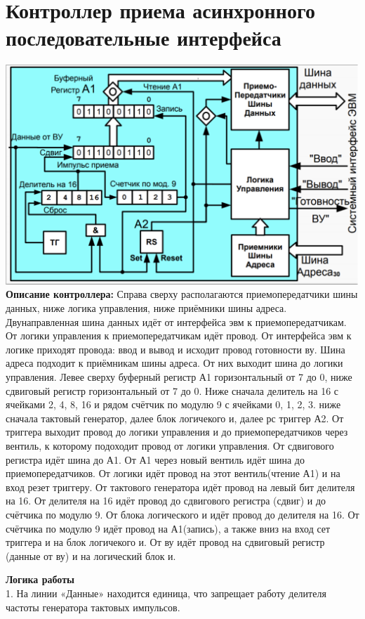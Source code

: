 \documentclass{article}
\begin{document}
\section{Контроллер приема асинхронного последовательные интерфейса}
\includegraphics[width=.8\textwidth]{in3.png}\\
\textbf{Описание контроллера:}
Справа сверху располагаются приемопередатчики шины данных, ниже логика управления, ниже приёмники шины адреса. Двунаправленная шина данных идёт от интерфейса эвм к приемопередатчикам. От логики управления к приемопередатчикам идёт провод. От интерфейса эвм к логике приходят провода: ввод и вывод и исходит провод готовности ву. 
Шина адреса подходит к приёмникам шины адреса. От них выходит шина до логики управления.
Левее сверху буферный регистр А1 горизонтальный от 7 до 0, ниже сдвиговый регистр горизонтальный от 7 до 0. Ниже сначала делитель на 16 с ячейками 2, 4, 8, 16 и рядом счётчик по модулю 9 с ячейками 0, 1, 2, 3. 
ниже сначала тактовый генератор, далее блок логичекого и, далее рс триггер А2.
От триггера выходит провод до логики управления  и до приемопередатчиков через вентиль, к которому подоходит провод от логики управления.
От сдвигового регистра идёт шина до А1.
От А1 через новый вентиль идёт шина до приемопередатчиков.
От логики идёт провод на этот вентиль(чтение А1) и на вход резет триггеру.
От тактового генератора идёт провод на левый бит делителя на 16.
От делителя на 16 идёт провод до сдвигового регистра (сдвиг) и до счётчика по модулю 9.
От блока логического и идёт провод до делителя на 16.
От счётчика по модулю 9 идёт провод на А1(запись), а также вниз на вход сет триггера и на блок логичекого и.
От ву идёт провод на сдвиговый регистр (данные от ву) и на логический блок и.

\textbf{Логика работы}\\
1. На линии «Данные» находится единица, что запрещает работу делителя частоты генератора тактовых импульсов.
\end{document}
